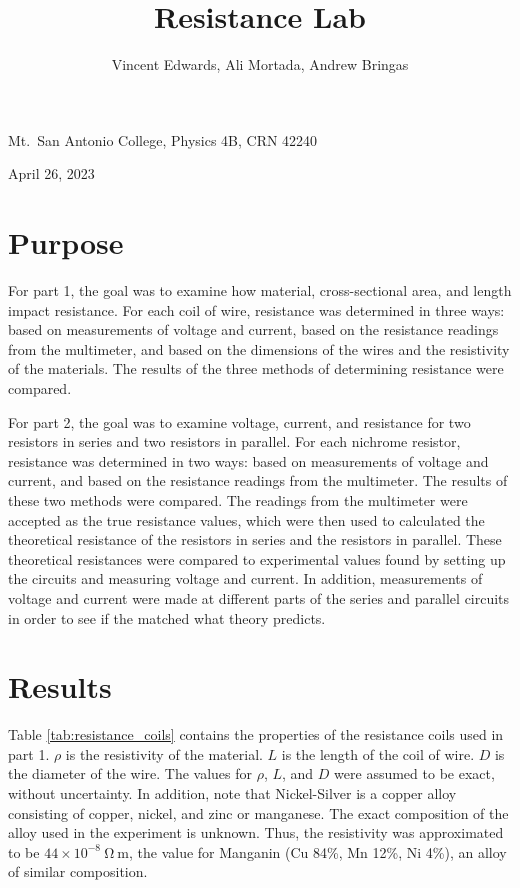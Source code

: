 \documentclass[12pt]{iopart} %
\gdef\sci#1#2{#1 \times 10^{#2}}
\gdef\units#1{~\mathrm{#1}}
\begin{document}
\title{Resistance Lab}
\author{Vincent Edwards, Ali Mortada, Andrew Bringas}
\vspace{10pt}
\begin{indented}
  \item[]Mt.~San Antonio College, Physics 4B, CRN 42240
  \item[]April 26, 2023
\end{indented}
\newpage

\section{Purpose}

For part 1, the goal was to examine how material, cross-sectional area, and length impact resistance.
For each coil of wire, resistance was determined in three ways: based on measurements of voltage and current, based on the resistance readings from the multimeter, and based on the dimensions of the wires and the resistivity of the materials.
The results of the three methods of determining resistance were compared.

For part 2, the goal was to examine voltage, current, and resistance for two resistors in series and two resistors in parallel.
For each nichrome resistor, resistance was determined in two ways: based on measurements of voltage and current, and based on the resistance readings from the multimeter.
The results of these two methods were compared.
The readings from the multimeter were accepted as the true resistance values, which were then used to calculated the theoretical resistance of the resistors in series and the resistors in parallel.
These theoretical resistances were compared to experimental values found by setting up the circuits and measuring voltage and current.
In addition, measurements of voltage and current were made at different parts of the series and parallel circuits in order to see if the matched what theory predicts.

\section{Results}

Table \ref{tab:resistance_coils} contains the properties of the resistance coils used in part 1.
$\rho$ is the resistivity of the material.
$L$ is the length of the coil of wire.
$D$ is the diameter of the wire.
The values for $\rho$, $L$, and $D$ were assumed to be exact, without uncertainty.
In addition, note that Nickel-Silver is a copper alloy consisting of copper, nickel, and zinc or manganese.
The exact composition of the alloy used in the experiment is unknown.
Thus, the resistivity was approximated to be $\sci{44}{-8} \units{\Omega~m}$, the value for Manganin (Cu 84\%, Mn 12\%, Ni 4\%), an alloy of similar composition.
\end{document}
